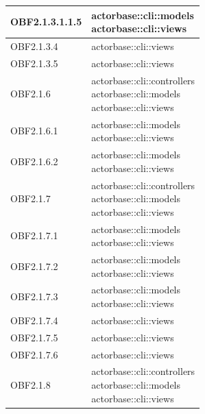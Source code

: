 \documentclass{scalatekids-article}
\begin{document}
\begin{longtable}[H]{|p{3.5cm}|p{7.5cm}|}
  \hline
  OBF2.1.3.1.1.5 & \multiLineCell[t]{actorbase::cli::models\\actorbase::cli::views\\}\\
  \hline
  OBF2.1.3.4 & \multiLineCell[t]{actorbase::cli::views\\}\\
  \hline
  OBF2.1.3.5 & \multiLineCell[t]{actorbase::cli::views\\}\\
  \hline
  OBF2.1.6 & \multiLineCell[t]{actorbase::cli::controllers\\actorbase::cli::models\\actorbase::cli::views\\}\\
  \hline
  OBF2.1.6.1 & \multiLineCell[t]{actorbase::cli::models\\actorbase::cli::views\\}\\
  \hline
  OBF2.1.6.2 & \multiLineCell[t]{actorbase::cli::models\\actorbase::cli::views\\}\\
  \hline
  OBF2.1.7 & \multiLineCell[t]{actorbase::cli::controllers\\actorbase::cli::models\\actorbase::cli::views\\}\\
  \hline
  OBF2.1.7.1 & \multiLineCell[t]{actorbase::cli::models\\actorbase::cli::views\\}\\
  \hline
  OBF2.1.7.2 & \multiLineCell[t]{actorbase::cli::models\\actorbase::cli::views\\}\\
  \hline
  OBF2.1.7.3 & \multiLineCell[t]{actorbase::cli::models\\actorbase::cli::views\\}\\
  \hline
  OBF2.1.7.4 & \multiLineCell[t]{actorbase::cli::views\\}\\
  \hline
  OBF2.1.7.5 & \multiLineCell[t]{actorbase::cli::views\\}\\
  \hline
  OBF2.1.7.6 & \multiLineCell[t]{actorbase::cli::views\\}\\
  \hline
  OBF2.1.8 & \multiLineCell[t]{actorbase::cli::controllers\\actorbase::cli::models\\actorbase::cli::views\\}\\

\end{longtable}
\end{document}

